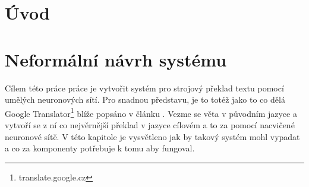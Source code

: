 \chapter{Úvod}

\chapter{Neformální návrh systému} \label{section:draft}
Cílem této práce práce je vytvořit systém pro strojový překlad textu pomocí umělých neuronových sítí. Pro snadnou představu, je to totéž jako to co dělá Google Translator\footnote{translate.google.cz} blíže popsáno v článku \cite{googleBridgingGap}. Vezme se věta v původním jazyce a vytvoří se z ní co nejvěrnější překlad v jazyce cílovém a to za pomocí nacvičené neuronové sítě. V této kapitole je vysvětleno jak by takový systém mohl vypadat a co za komponenty potřebuje k tomu aby fungoval.

